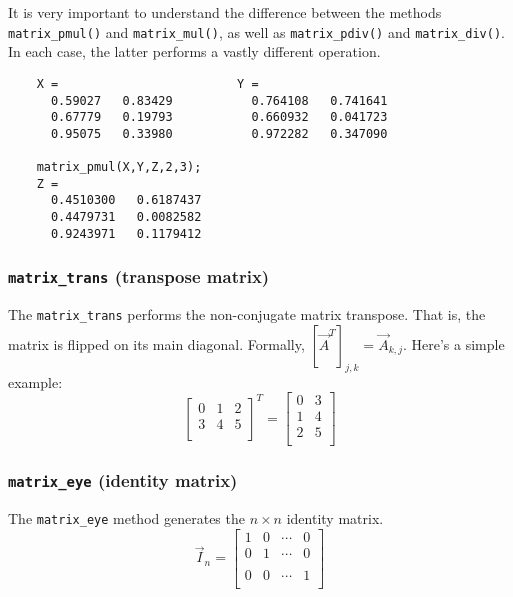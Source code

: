 It is very important to understand the difference between the methods
{\tt matrix\_pmul()} and {\tt matrix\_mul()}, as well as
{\tt matrix\_pdiv()} and {\tt matrix\_div()}.
In each case, the latter performs a vastly different operation.
%
\begin{verbatim}
    X =                         Y =
      0.59027   0.83429           0.764108   0.741641
      0.67779   0.19793           0.660932   0.041723
      0.95075   0.33980           0.972282   0.347090

    matrix_pmul(X,Y,Z,2,3);
    Z =
      0.4510300   0.6187437
      0.4479731   0.0082582
      0.9243971   0.1179412
\end{verbatim}

\subsubsection{{\tt matrix\_trans} (transpose matrix)}
\label{module:matrix:trans}
The {\tt matrix\_trans} performs the non-conjugate matrix transpose.
That is, the matrix is flipped on its main diagonal.
Formally, $[\vec{A}^T]_{j,k} = \vec{A}_{k,j}$.
Here's a simple example:
\[
    \left[
    \begin{array}{ccc}
    0 & 1 & 2 \\
    3 & 4 & 5 \\
    \end{array}
    \right]^T
    =
    \left[
    \begin{array}{cc}
    0 & 3 \\
    1 & 4 \\
    2 & 5 \\
    \end{array}
    \right]
\]


\subsubsection{{\tt matrix\_eye} (identity matrix)}
\label{module:matrix:eye}
The {\tt matrix\_eye} method generates the $n \times n$ identity matrix.
\[
    \vec{I}_n = 
    \begin{bmatrix}
        1 & 0 & \cdots & 0 \\
        0 & 1 & \cdots & 0 \\
        \\
        0 & 0 & \cdots & 1 \\
    \end{bmatrix}
\]

